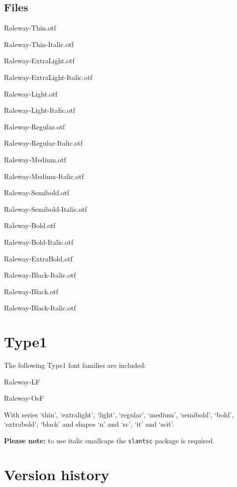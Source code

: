 \documentclass[10pt,a4paper,english]{article}
\begin{document}
\begin{multicols}{2}
\subsection{Files}
\begin{itemize*}
	\item Raleway-Thin.otf
	\item Raleway-Thin-Italic.otf
	\item Raleway-ExtraLight.otf
	\item Raleway-ExtraLight-Italic.otf
	\item Raleway-Light.otf
	\item Raleway-Light-Italic.otf
	\item Raleway-Regular.otf
	\item Raleway-Regular-Italic.otf
	\item Raleway-Medium.otf
	\item Raleway-Medium-Italic.otf
	\item Raleway-Semibold.otf
	\item Raleway-Semibold-Italic.otf
	\item Raleway-Bold.otf
	\item Raleway-Bold-Italic.otf
	\item Raleway-ExtraBold.otf
	\item Raleway-Black-Italic.otf
	\item Raleway-Black.otf
	\item Raleway-Black-Italic.otf
\end{itemize*}

\section{Type1}
The following Type1 font families are included:
\begin{itemize*}
	\item Raleway-LF
	\item Raleway-OsF
\end{itemize*}

With series ‘thin’, ‘extralight’, ‘light’, ‘regular’, ‘medium’, ‘semibold’, ‘bold’, ‘extrabold’, ‘black’ and shapes ‘n’ and ‘sc’, ‘it’ and ‘scit’.

\textbf{Please note:} to use italic smallcaps the \texttt{slantsc} package is required.

\section{Version history}

\end{multicols}
\end{document}
